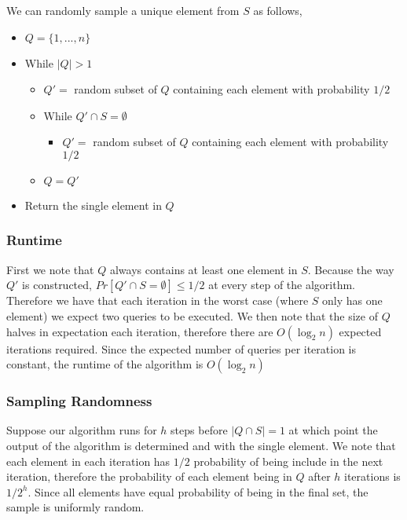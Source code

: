 \documentclass[a4paper]{article}
\begin{document}
We can randomly sample a unique element from $S$ as follows,

\begin{itemize}
	\item $Q =\{1,...,n\}$ 
	\item While $|Q| > 1$
	\begin{itemize}
			\item $Q' =$ random subset of $Q$ containing each element with probability $1/2$
			\item While $Q' \cap S = \emptyset$
			\begin{itemize}
				\item $Q' =$ random subset of $Q$ containing each element with probability $1/2$
			\end{itemize}
			\item $Q = Q'$
	\end{itemize}
	\item Return the single element in $Q$
\end{itemize}


\subsubsection{Runtime}

First we note that $Q$ always contains at least one element in $S$. Because the way $Q'$ is constructed,
$Pr[Q' \cap S = \emptyset] \leq 1/2$ at every step of the algorithm. Therefore we have that each iteration
in the worst case (where $S$ only has one element) we expect two queries to be executed. We then note that 
the size of $Q$ halves in expectation each iteration, therefore there are $O(\log_2 n)$ expected iterations
required. Since the expected number of queries per iteration is constant, the runtime of the algorithm 
is $O(\log_2 n)$

\subsubsection{Sampling Randomness}


Suppose our algorithm runs for $h$ steps before $|Q \cap S| = 1$  at which point the output
of the algorithm is determined and with the single element. We note that 
each element in each iteration has $1/2$ probability of being include in the next iteration, therefore 
the probability of each element being in $Q$ after $h$ iterations is $1/2^h$. Since all elements have equal probability
of being in the final set, the sample is uniformly random.




%
%
\end{document}
